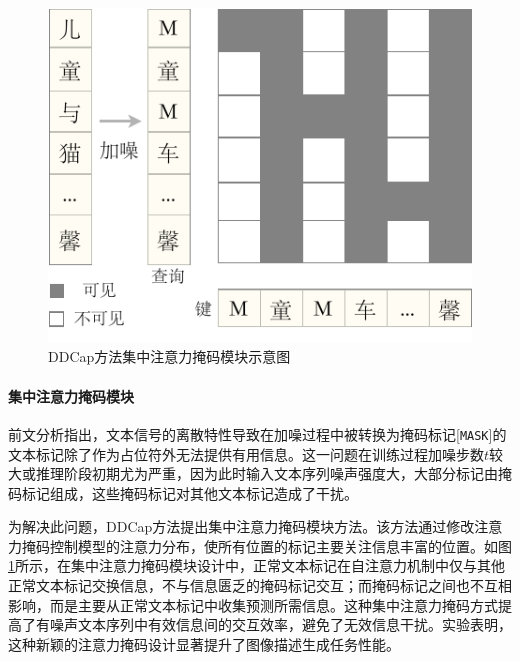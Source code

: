 \begin{figure}
  \centering
  \includegraphics[width=0.6\linewidth]{figures/ddcap-attn.pdf}
  \caption{DDCap方法集中注意力掩码模块示意图}
  \label{fig:ddcap-attn}
\end{figure}

\paragraph{集中注意力掩码模块} 前文分析指出，文本信号的离散特性导致在加噪过程中被转换为掩码标记[\texttt{MASK}]的文本标记除了作为占位符外无法提供有用信息。这一问题在训练过程加噪步数$t$较大或推理阶段初期尤为严重，因为此时输入文本序列噪声强度大，大部分标记由掩码标记组成，这些掩码标记对其他文本标记造成了干扰。

为解决此问题，DDCap方法提出集中注意力掩码模块方法。该方法通过修改注意力掩码控制模型的注意力分布，使所有位置的标记主要关注信息丰富的位置。如图\ref{fig:ddcap-attn}所示，在集中注意力掩码模块设计中，正常文本标记在自注意力机制中仅与其他正常文本标记交换信息，不与信息匮乏的掩码标记交互；而掩码标记之间也不互相影响，而是主要从正常文本标记中收集预测所需信息。这种集中注意力掩码方式提高了有噪声文本序列中有效信息间的交互效率，避免了无效信息干扰。实验表明，这种新颖的注意力掩码设计显著提升了图像描述生成任务性能。


